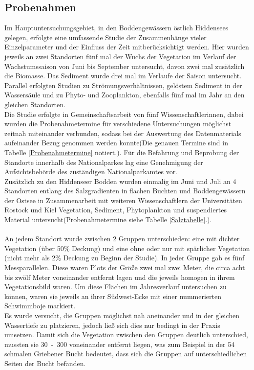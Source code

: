 \subsection{Probenahmen}

Im Hauptuntersuchungsgebiet, in den Boddengewässern östlich Hiddensees gelegen, erfolgte eine umfassende Studie der Zusammenhänge vieler Einzelparameter und der Einfluss der Zeit mitberücksichtigt werden. Hier wurden jeweils an zwei Standorten fünf mal der Wuchs der Vegetation im Verlauf der Wachstumssaison von Juni bis September untersucht, davon zwei mal zusätzlich die Biomasse. Das Sediment wurde drei mal im Verlaufe der Saison untersucht. Parallel erfolgten Studien zu Strömungsverhältnissen, gelöstem Sediment in der Wassersäule und zu Phyto- und Zooplankton, ebenfalls fünf mal im Jahr an den gleichen Standorten. \\
Die Studie erfolgte in Gemeinschaftsarbeit von fünf Wissenschaftlerinnen, dabei wurden die Probenahmetermine für verschiedene Untersuchungen möglichst zeitnah miteinander verbunden, sodass bei der Auswertung des Datenmaterials aufeinander Bezug genommen werden konnte(Die genauen Termine sind in Tabelle \ref{Probenahmetermine} notiert.). Für die Befahrung und Beprobung der Standorte innerhalb des Nationalparkes lag eine Genehmigung der Aufsichtsbehörde des zuständigen Nationalparkamtes vor. \\
Zusätzlich zu den Hiddenseer Bodden wurden einmalig im Juni und Juli an 4 Standorten entlang des Salzgradienten in flachen Buchten und Boddengewässern der Ostsee  in Zusammenarbeit mit weiteren Wissenschaftlern der Universitäten Rostock und Kiel Vegetation, Sediment, Phytoplankton und suspendiertes Material untersucht(Probenahmetermine siehe Tabelle \ref{Salztabelle}.). \\
\\
An jedem Standort wurde zwischen 2 Gruppen unterschieden: eine mit dichter Vegetation (über \unit{50}{\%} Deckung) und eine ohne oder nur mit spärlicher Vegetation (nicht mehr als \unit{2}{\%} Deckung zu Beginn der Studie). In jeder Gruppe gab es fünf Messparallelen. Diese waren Plots der Größe zwei mal zwei Meter, die circa acht bis zwölf Meter voneinander entfernt lagen und die jeweils homogen in ihrem Vegetationsbild waren. Um diese Flächen im Jahresverlauf untersuchen zu können, waren sie jeweils an ihrer Südwest-Ecke mit einer nummerierten Schwimmboje markiert.\\ 
Es wurde versucht, die Gruppen möglichst nah aneinander und in der gleichen Wassertiefe zu platzieren, jedoch ließ sich dies nur bedingt in der Praxis umsetzen. Damit sich die Vegetation zwischen den Gruppen deutlich unterschied, mussten sie \unit{30-300}{\metre} voneinander entfernt liegen, was zum Beispiel in der \unit{54}{\metre} schmalen Griebener Bucht bedeutet, dass sich die Gruppen auf unterschiedlichen Seiten der Bucht befanden. 




